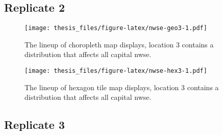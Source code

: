 \documentclass{monashthesis}
\begin{document}
\hypertarget{replicate-2-2}{%
\subsection{Replicate 2}\label{replicate-2-2}}

\begin{Shaded}
\begin{Highlighting}[]
\NormalTok{() }\OperatorTok{+}
\StringTok{  }\NormalTok{(}\NormalTok{(}\NormalTok{(}\NormalTok{)))}
\end{Highlighting}
\end{Shaded}

\begin{figure}
\centering
\texttt{[image: thesis\_files/figure-latex/nwse-geo3-1.pdf]}
\caption{\label{fig:nwse-geo3}The lineup of choropleth map displays, location 3 contains a distribution that affects all capital nwse.}
\end{figure}

\begin{Shaded}
\begin{Highlighting}[]
\NormalTok{() }\OperatorTok{+}
\StringTok{  }\NormalTok{(}\NormalTok{(}\NormalTok{(}\NormalTok{)))}
\end{Highlighting}
\end{Shaded}

\begin{figure}
\centering
\texttt{[image: thesis\_files/figure-latex/nwse-hex3-1.pdf]}
\caption{\label{fig:nwse-hex3}The lineup of hexagon tile map displays, location 3 contains a distribution that affects all capital nwse.}
\end{figure}

\hypertarget{replicate-3-2}{%
\subsection{Replicate 3}\label{replicate-3-2}}

\begin{Shaded}
\begin{Highlighting}[]
\NormalTok{() }\OperatorTok{+}
\StringTok{  }\NormalTok{(}\NormalTok{(}\NormalTok{(}\NormalTok{)))}
\end{Highlighting}
\end{Shaded}
\end{document}
